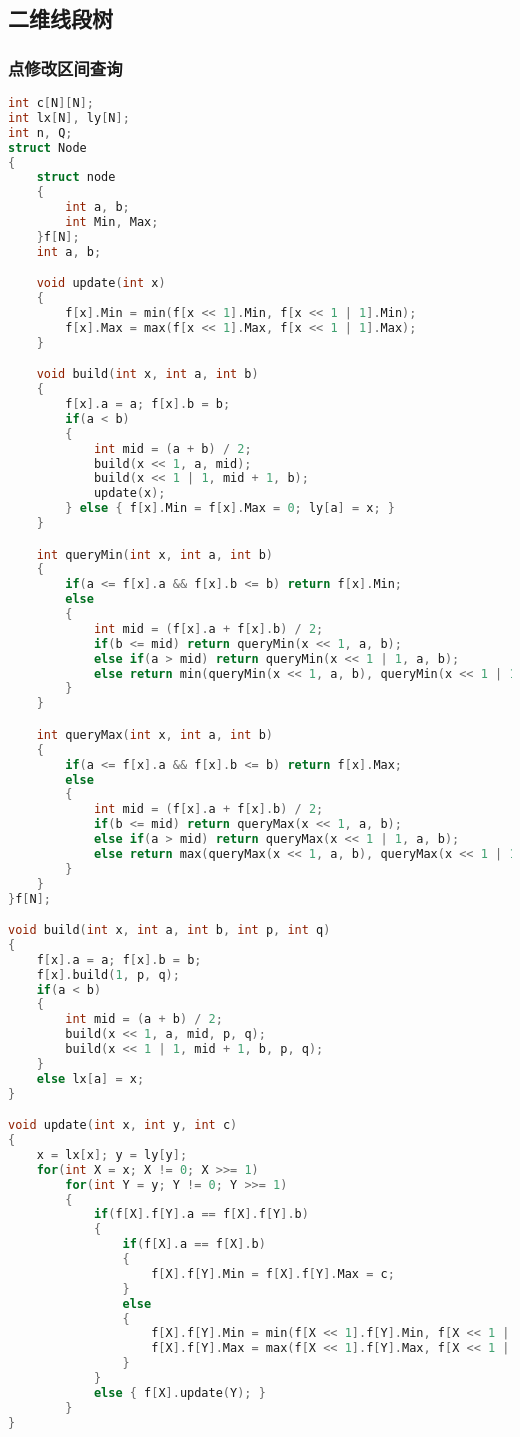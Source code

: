 ﻿\subsection{二维线段树}
	\subsubsection{点修改区间查询}
	\begin{lstlisting}[language=C++]
int c[N][N];
int lx[N], ly[N];
int n, Q;
struct Node
{
    struct node
    {
        int a, b;
        int Min, Max;
    }f[N];
    int a, b;

    void update(int x)
    {
        f[x].Min = min(f[x << 1].Min, f[x << 1 | 1].Min);
        f[x].Max = max(f[x << 1].Max, f[x << 1 | 1].Max);
    }

    void build(int x, int a, int b)
    {
        f[x].a = a; f[x].b = b;
        if(a < b)
        {
            int mid = (a + b) / 2;
            build(x << 1, a, mid);
            build(x << 1 | 1, mid + 1, b);
            update(x);
        } else { f[x].Min = f[x].Max = 0; ly[a] = x; }
    }

    int queryMin(int x, int a, int b)
    {
        if(a <= f[x].a && f[x].b <= b) return f[x].Min;
        else
        {
            int mid = (f[x].a + f[x].b) / 2;
            if(b <= mid) return queryMin(x << 1, a, b);
            else if(a > mid) return queryMin(x << 1 | 1, a, b);
            else return min(queryMin(x << 1, a, b), queryMin(x << 1 | 1, a, b));
        }
    }

    int queryMax(int x, int a, int b)
    {
        if(a <= f[x].a && f[x].b <= b) return f[x].Max;
        else
        {
            int mid = (f[x].a + f[x].b) / 2;
            if(b <= mid) return queryMax(x << 1, a, b);
            else if(a > mid) return queryMax(x << 1 | 1, a, b);
            else return max(queryMax(x << 1, a, b), queryMax(x << 1 | 1, a, b));
        }
    }
}f[N];

void build(int x, int a, int b, int p, int q)
{
    f[x].a = a; f[x].b = b;
    f[x].build(1, p, q);
    if(a < b)
    {
        int mid = (a + b) / 2;
        build(x << 1, a, mid, p, q);
        build(x << 1 | 1, mid + 1, b, p, q);
    }
    else lx[a] = x;
}

void update(int x, int y, int c)
{
    x = lx[x]; y = ly[y];
    for(int X = x; X != 0; X >>= 1)
        for(int Y = y; Y != 0; Y >>= 1)
        {
            if(f[X].f[Y].a == f[X].f[Y].b)
            {
                if(f[X].a == f[X].b)
                {
                    f[X].f[Y].Min = f[X].f[Y].Max = c;
                }
                else
                {
                    f[X].f[Y].Min = min(f[X << 1].f[Y].Min, f[X << 1 | 1].f[Y].Min);
                    f[X].f[Y].Max = max(f[X << 1].f[Y].Max, f[X << 1 | 1].f[Y].Max);
                }
            }
            else { f[X].update(Y); }
        }
}


\end{lstlisting}
